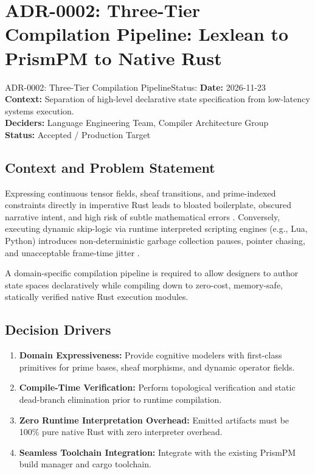 \section{ADR-0002: Three-Tier Compilation Pipeline: Lexlean to PrismPM to Native Rust}
\label{sec:adr0002}

\begin{adrbox}{ADR-0002: Three-Tier Compilation Pipeline}{Status: }
\textbf{Date:} 2026-11-23 \\
\textbf{Context:} Separation of high-level declarative state specification from low-latency systems execution. \\
\textbf{Deciders:} Language Engineering Team, Compiler Architecture Group \\
\textbf{Status:} Accepted / Production Target
\end{adrbox}

\subsection{Context and Problem Statement}
Expressing continuous tensor fields, sheaf transitions, and prime-indexed constraints directly in imperative Rust leads to bloated boilerplate, obscured narrative intent, and high risk of subtle mathematical errors \cite{gregory2018game}. Conversely, executing dynamic skip-logic via runtime interpreted scripting engines (e.g., Lua, Python) introduces non-deterministic garbage collection pauses, pointer chasing, and unacceptable frame-time jitter \cite{nystrom2014game}.

A domain-specific compilation pipeline is required to allow designers to author state spaces declaratively while compiling down to zero-cost, memory-safe, statically verified native Rust execution modules.

\subsection{Decision Drivers}
\begin{enumerate}[label=\bfseries D\arabic*.]
    \item \textbf{Domain Expressiveness:} Provide cognitive modelers with first-class primitives for prime bases, sheaf morphisms, and dynamic operator fields.
    \item \textbf{Compile-Time Verification:} Perform topological verification and static dead-branch elimination prior to runtime compilation.
    \item \textbf{Zero Runtime Interpretation Overhead:} Emitted artifacts must be 100\% pure native Rust with zero interpreter overhead.
    \item \textbf{Seamless Toolchain Integration:} Integrate with the existing PrismPM build manager and cargo toolchain.
\end{enumerate}

